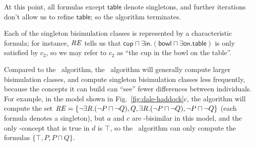 At this point, all
formulas except $\mathsf{table}$ denote singletons, and further
iterations don't allow us to refine $\mathsf{table}$; so the algorithm
terminates.

Each of the singleton bisimulation classes is represented
by a characteristic formula; for instance, $\mathit{RE}$ tells us that
$\mathsf{cup} \sqcap \exists \mathsf{in}. (\mathsf{bowl} \sqcap
\exists \mathsf{on}.\mathsf{table})$ is only satisfied by $c_2$, so we
may refer to $c_2$ as ``the cup in the bowl on the table''.

Compared to the \alc\ algorithm, the \el\ algorithm will generally
compute larger bisimulation classes, and compute singleton
bisimulation classes less frequently, because the concepts it can
build can ``see'' fewer differences between individuals.  For example,
in the model shown in Fig.~\ref{fig:dale-haddock}c, the \alc algorithm
will compute the set $\mathit{RE} = \{\neg \exists R. (\neg P \sqcap \neg Q),
Q, \exists R. (\neg P \sqcap \neg Q), \neg P \sqcap \neg Q\}$ (each formula denotes a singleton), but $a$ and $c$ are \el-bisimilar in this model,
and the only \el-concept that is true in $d$ is $\top$, so the \el\
algorithm can only compute the formulas $\{\top, P, P \sqcap Q\}$.



